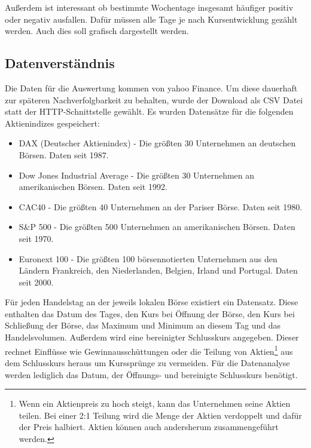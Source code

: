 Außerdem ist interessant ob bestimmte Wochentage insgesamt häufiger positiv oder negativ ausfallen. Dafür müssen alle Tage je nach Kursentwicklung gezählt werden. Auch dies soll grafisch dargestellt werden.


\subsection{Datenverständnis}


Die Daten für die Auswertung kommen von yahoo Finance. Um diese dauerhaft zur späteren Nachverfolgbarkeit zu behalten, wurde der Download als \gls{CSV} Datei statt der \gls{HTTP}-Schnittstelle gewählt. Es wurden Datensätze für die folgenden Aktienindizes gespeichert:

\begin{itemize}
    \item DAX (Deutscher Aktienindex) - Die größten 30 Unternehmen an deutschen Börsen. Daten seit 1987.
    \item Dow Jones Industrial Average - Die größten 30 Unternehmen an amerikanischen Börsen. Daten seit 1992.
    \item CAC40 - Die größten 40 Unternehmen an der Pariser Börse. Daten seit 1980.
    \item S\&P 500 - Die größten 500 Unternehmen an amerikanischen Börsen. Daten seit 1970.
    \item Euronext 100 - Die größten 100 börsennotierten Unternehmen aus den Ländern Frankreich, den Niederlanden, Belgien, Irland und Portugal. Daten seit 2000.
\end{itemize}

Für jeden Handelstag an der jeweils lokalen Börse existiert ein Datensatz. Diese enthalten das Datum des Tages, den Kurs bei Öffnung der Börse, den Kurs bei Schließung der Börse, das Maximum und Minimum an diesem Tag und das Handelsvolumen. Außerdem wird eine bereinigter Schlusskurs angegeben. Dieser rechnet Einflüsse wie Gewinnausschüttungen oder die Teilung von Aktien\footnote{Wenn ein Aktienpreis zu hoch steigt, kann das Unternehmen seine Aktien teilen. Bei einer 2:1 Teilung wird die Menge der Aktien verdoppelt und dafür der Preis halbiert. Aktien können auch andersherum zusammengeführt werden.} aus dem Schlusskurs heraus um Kurssprünge zu vermeiden. Für die Datenanalyse werden lediglich das Datum, der Öffnungs- und bereinigte Schlusskurs benötigt.

